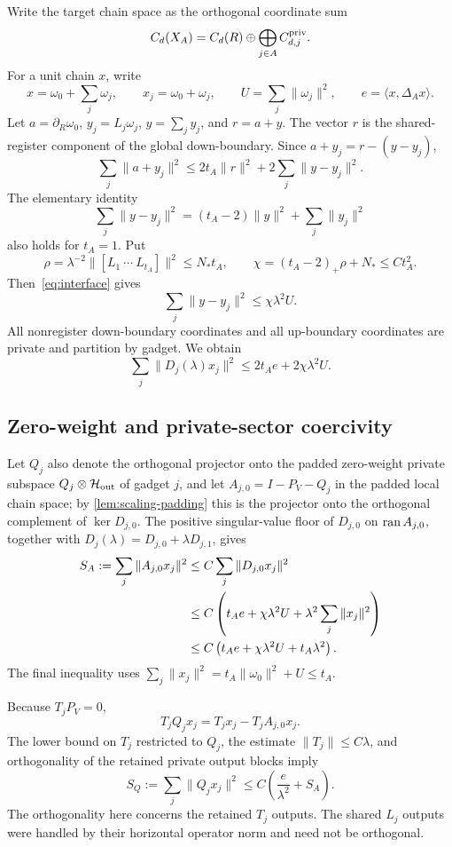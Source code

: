 Write the target chain space as the orthogonal coordinate sum
\[
C_d(X_A)=C_d(R)\oplus\bigoplus_{j\in A}C_{d,j}^{\rm priv}.
\]
For a unit chain \(x\), write
\[
x=\omega_0+\sum_j\omega_j,
\qquad
x_j=\omega_0+\omega_j,
\qquad
U=\sum_j\|\omega_j\|^2,
\qquad
e=\langle x,\Delta_Ax\rangle.
\]
Let \(a=\partial_R\omega_0\), \(y_j=L_j\omega_j\), \(y=\sum_jy_j\), and \(r=a+y\). The vector \(r\) is the shared-register component of the global down-boundary. Since
\(
a+y_j=r-(y-y_j)
\),
\[
\sum_j\|a+y_j\|^2
\le2t_A\|r\|^2+2\sum_j\|y-y_j\|^2.
\]
The elementary identity
\[
\sum_j\|y-y_j\|^2
=(t_A-2)\|y\|^2+\sum_j\|y_j\|^2
\]
also holds for \(t_A=1\). Put
\[
\rho=\lambda^{-2}\|[L_1\ \cdots\ L_{t_A}]\|^2
\le N_*t_A,
\qquad
\chi=(t_A-2)_+\rho+N_*\le C t_A^2.
\]
Then~\cref{eq:interface} gives
\[
\sum_j\|y-y_j\|^2\le\chi\lambda^2U.
\]
All nonregister down-boundary coordinates and all up-boundary coordinates are private and partition by gadget. We obtain
\begin{equation}
\label{eq:appendix-local-energy}
\sum_j\|D_j(\lambda)x_j\|^2
\le2t_Ae+2\chi\lambda^2U.
\end{equation}

\subsection{Zero-weight and private-sector coercivity}

Let \(Q_j\) also denote the orthogonal projector onto the padded zero-weight private subspace \(Q_j\otimes\mathcal{H}_{\rm out}\) of gadget \(j\), and let \(A_{j,0}=I-P_V-Q_j\) in the padded local chain space; by \cref{lem:scaling-padding} this is the projector onto the orthogonal complement of \(\ker D_{j,0}\). The positive singular-value floor of \(D_{j,0}\) on \(\operatorname{ran} A_{j,0}\), together with
\(
D_j(\lambda)=D_{j,0}+\lambda D_{j,1}
\), gives
\begin{align}
S_A:=\sum_j\|A_{j,0}x_j\|^2
&\le C\sum_j\|D_{j,0}x_j\|^2\notag\\
&\le C\left(
t_Ae+\chi\lambda^2U+
\lambda^2\sum_j\|x_j\|^2
\right)\notag\\
&\le C\left(t_Ae+\chi\lambda^2U+t_A\lambda^2\right).
\label{eq:appendix-SA}
\end{align}
The final inequality uses
\(
\sum_j\|x_j\|^2
=t_A\|\omega_0\|^2+U\le t_A
\).

Because \(T_jP_V=0\),
\[
T_jQ_jx_j=T_jx_j-T_jA_{j,0}x_j.
\]
The lower bound on \(T_j\) restricted to \(Q_j\), the estimate \(\|T_j\|\le C\lambda\), and orthogonality of the retained private output blocks imply
\begin{equation}
\label{eq:appendix-SQ}
S_Q:=\sum_j\|Q_jx_j\|^2
\le C\left(\frac{e}{\lambda^2}+S_A\right).
\end{equation}
The orthogonality here concerns the retained \(T_j\) outputs. The shared \(L_j\) outputs were handled by their horizontal operator norm and need not be orthogonal.

